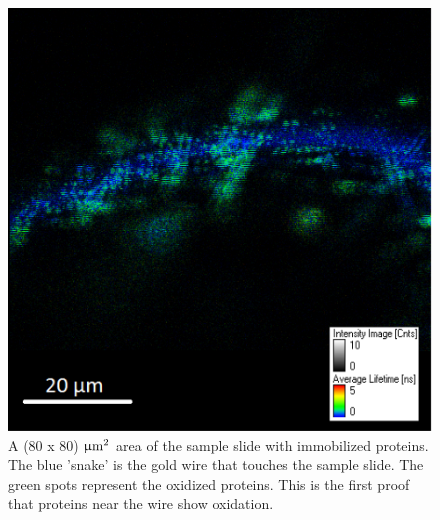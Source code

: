 \documentclass[twoside,single]{lion-msc}
\begin{document}
\begin{figure}[ht!]
\centering
\includegraphics[width=\textwidth]{goldwire_1}
\caption{A (80 x 80) $\upmu \textup{m}^{2}$ area of the sample slide with immobilized proteins. The blue 'snake' is the gold wire that touches the sample slide. The green spots represent the oxidized proteins. This is the first proof that proteins near the wire show oxidation.}
\label{goldenwire_1}
\end{figure}
\end{document}
